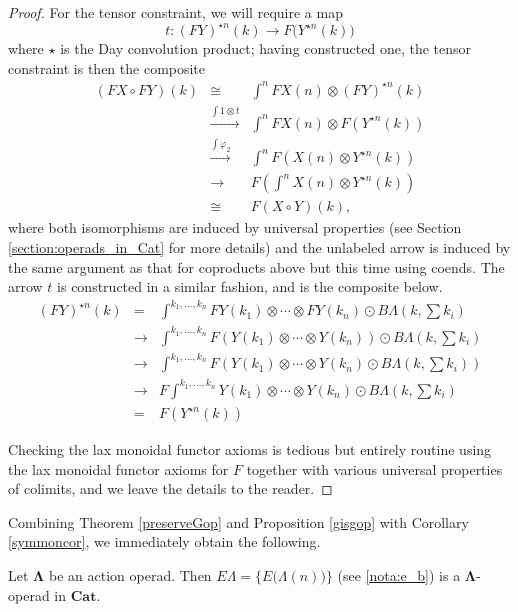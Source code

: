 \documentclass{amsbook} %
\newcommand{\mb}{\mathbf}
\numberwithin{section}{chapter}
\begin{document}
\begin{proof}
For the tensor constraint, we will require a map
\[
t:(FY)^{\star n}(k) \rightarrow F\big(Y^{\star n}(k)\big)
\]
 where $\star$ is the Day convolution product; having constructed one, the tensor constraint is then the composite
\[
\begin{array}{rcl}
(FX \circ FY)(k) & \cong & \int^{n} FX(n) \otimes (FY)^{\star n}(k) \\
& \stackrel{ \int 1 \otimes t}{\longrightarrow}  & \int^{n} FX(n) \otimes F(Y^{\star n}(k)) \\
& \stackrel{\int \varphi_{2}}{\longrightarrow}  & \int^{n} F(X(n) \otimes Y^{\star n}(k)) \\
& \longrightarrow & F (\int^{n} X(n) \otimes Y^{\star n}(k)) \\
& \cong & F(X \circ Y)(k),
\end{array}
\]
where both isomorphisms are induced by universal properties (see Section \ref{section:operads_in_Cat} for more details) and the unlabeled arrow is induced by the same argument as that for coproducts above but this time using coends.  The arrow $t$ is constructed in a similar fashion, and is the composite below.
\[
\begin{array}{rcl}
(FY)^{\star n}(k) & = & \int^{k_{1}, \ldots, k_{n}} FY(k_{1}) \otimes \cdots \otimes FY(k_{n}) \odot B\Lambda(k, \sum k_{i}) \\
& \rightarrow &  \int^{k_{1}, \ldots, k_{n}} F(Y(k_{1}) \otimes \cdots \otimes Y(k_{n})) \odot B\Lambda(k, \sum k_{i}) \\
& \rightarrow & \int^{k_{1}, \ldots, k_{n}} F(Y(k_{1}) \otimes \cdots \otimes Y(k_{n}) \odot B\Lambda(k, \sum k_{i}) ) \\
& \rightarrow & F\int^{k_{1}, \ldots, k_{n}} Y(k_{1}) \otimes \cdots \otimes Y(k_{n}) \odot B\Lambda(k, \sum k_{i})  \\
& = & F(Y^{\star n}(k))
\end{array}
\]

Checking the lax monoidal functor axioms is tedious but entirely routine using the lax monoidal functor axioms for $F$ together with various universal properties of colimits, and we leave the details to the reader.
\end{proof}



Combining Theorem \ref{preserveGop} and Proposition \ref{gisgop} with Corollary \ref{symmoncor}, we immediately obtain the following.

\begin{cor}\label{cor:elambda_lambdaop}
Let $\mb{\Lambda}$ be an action operad.  Then $E\Lambda = \{ E\big(\Lambda(n)\big) \}$ (see \cref{nota:e_b}) is a $\mb{\Lambda}$-operad in $\mb{Cat}$.
\end{cor}
\end{document}
